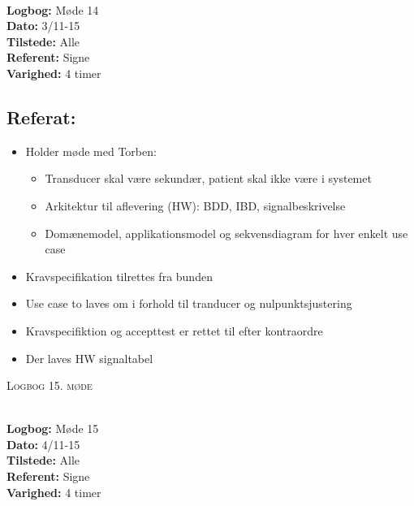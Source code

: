 \documentclass[a4paper,11pt,oneside]{memoir}
\begin{document}
\textbf{ }
\\
\textbf{Logbog:} Møde 14
\\
\textbf{Dato:} 3/11-15
\\
\textbf{Tilstede:} Alle
\\
\textbf{Referent:} Signe
\\
\textbf{Varighed:} 4 timer
\\

\subsection{Referat:}
\begin{itemize}
\item Holder møde med Torben:
\begin{itemize}
\item Transducer skal være sekundær, patient skal ikke være i systemet
\item Arkitektur til aflevering (HW): BDD, IBD, signalbeskrivelse 
\item Domænemodel, applikationsmodel og sekvensdiagram for hver enkelt use case
\end{itemize}
\item Kravspecifikation tilrettes fra bunden 
\item Use case to laves om i forhold til tranducer og nulpunktsjustering
\item Kravspecifiktion og accepttest er rettet til efter kontraordre
\item Der laves HW signaltabel
\end{itemize}

\newpage


\begin{center} 
\huge{\textsc{Logbog 15. møde}}
\end{center}

\textbf{ }
\\
\textbf{Logbog:} Møde 15
\\
\textbf{Dato:} 4/11-15
\\
\textbf{Tilstede:} Alle
\\
\textbf{Referent:} Signe
\\
\textbf{Varighed:} 4 timer
\\
\end{document}
